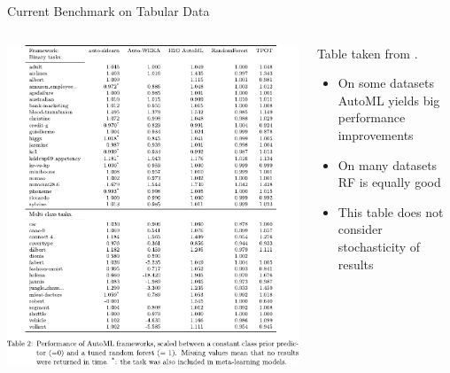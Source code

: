 \begin{frame}{Current Benchmark on Tabular Data}
  \begin{columns}
    \begin{column}{0.43\textwidth}
      \vspace{-0.7cm}
      \begin{center}
        \includegraphics[width = \textwidth]{images/gijsbers_open_2019_tab2.pdf}
      \end{center}
    \end{column}%
    \begin{column}{0.57\textwidth}
      Table taken from .

      \begin{itemize}
        \item On some datasets AutoML yields big performance improvements
        \item On many datasets RF is equally good
        \item This table does not consider stochasticity of results
      \end{itemize}

    \end{column}
  \end{columns}
\end{frame}

